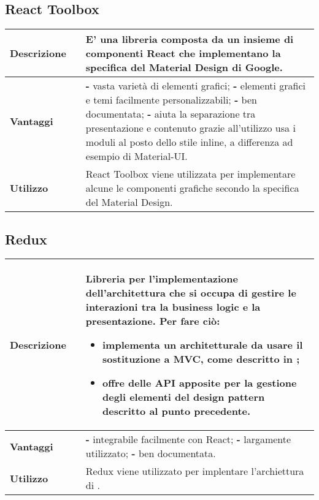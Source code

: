 \vspace{40px}
\subsection{React Toolbox}
\label{React Toolbox}
\begin{table}[H]
	\centering
	\begin{tabular}{p{2cm}p{0.5cm}p{11.5cm}}
		\arrayrulecolor{lightgray}
		\toprule
		\textbf{Descrizione} & &
		E' una libreria \js{} composta da un insieme di componenti React che implementano la specifica del Material Design di Google.
		\\ \midrule
		\textbf{Vantaggi} & &
		\textbf{- } vasta varietà di elementi grafici; \newline
		\textbf{- } elementi grafici e temi facilmente personalizzabili; \newline
		\textbf{- } ben documentata; \newline
		\textbf{- } aiuta la separazione tra presentazione e contenuto grazie all'utilizzo usa i moduli \glo{CSS}{CSS} al posto dello stile inline, a differenza ad esempio di Material-UI.
		\\ \midrule
		\textbf{Utilizzo} & &
		React Toolbox viene utilizzata per implementare alcune le componenti grafiche secondo la specifica del Material Design.
		\\\bottomrule
	\end{tabular}
\end{table}



\newpage
\subsection{Redux}
\label{Redux}
\begin{table}[H]
	\centering
	\begin{tabular}{p{2cm}p{0.5cm}p{11.5cm}}
		\arrayrulecolor{lightgray}
		\toprule
		\textbf{Descrizione} & &
		Libreria per l’implementazione dell’architettura che si occupa di gestire le interazioni tra la business logic e la presentazione.
		Per fare ciò:
		\begin{itemize}
			\item implementa un \glo{Design pattern}{design pattern} architetturale da usare il sostituzione a MVC, come descritto in
			\nameref{dp_redux};
			\item offre delle API apposite per la gestione degli elementi del design pattern descritto al punto precedente.
		\end{itemize}
		\\ \midrule
		\textbf{Vantaggi} & &
		\textbf{- } integrabile facilmente con React; \newline
		\textbf{- } largamente utilizzato; \newline
		\textbf{- } ben documentata.
		\\ \midrule
		\textbf{Utilizzo} & &
		Redux viene utilizzato per implentare l'archiettura di \progetto.
		\\\bottomrule
	\end{tabular}
\end{table}



